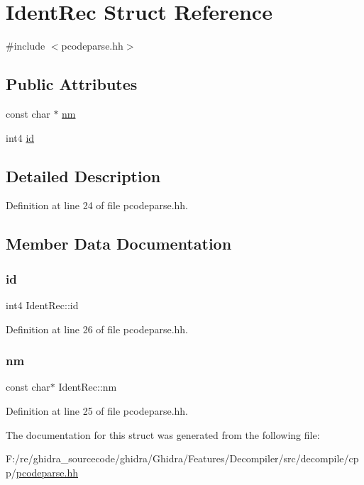 \hypertarget{struct_ident_rec}{}\section{Ident\+Rec Struct Reference}
\label{struct_ident_rec}


{\ttfamily \#include $<$pcodeparse.\+hh$>$}

\subsection*{Public Attributes}
\begin{DoxyCompactItemize}
\item 
const char $\ast$ \mbox{\hyperlink{struct_ident_rec_a62ae3cc7b240f9161d9ecddb11ae0eb0}{nm}}
\item 
int4 \mbox{\hyperlink{struct_ident_rec_a2268ac5f251839b75a46a5b667aebe00}{id}}
\end{DoxyCompactItemize}


\subsection{Detailed Description}


Definition at line 24 of file pcodeparse.\+hh.



\subsection{Member Data Documentation}
\mbox{\label{struct_ident_rec_a2268ac5f251839b75a46a5b667aebe00}} 
\subsubsection{\texorpdfstring{id}{id}}
{\footnotesize\ttfamily int4 Ident\+Rec\+::id}



Definition at line 26 of file pcodeparse.\+hh.

\mbox{\label{struct_ident_rec_a62ae3cc7b240f9161d9ecddb11ae0eb0}} 
\subsubsection{\texorpdfstring{nm}{nm}}
{\footnotesize\ttfamily const char$\ast$ Ident\+Rec\+::nm}



Definition at line 25 of file pcodeparse.\+hh.



The documentation for this struct was generated from the following file\+:\begin{DoxyCompactItemize}
\item 
F\+:/re/ghidra\+\_\+sourcecode/ghidra/\+Ghidra/\+Features/\+Decompiler/src/decompile/cpp/\mbox{\hyperlink{pcodeparse_8hh}{pcodeparse.\+hh}}\end{DoxyCompactItemize}

